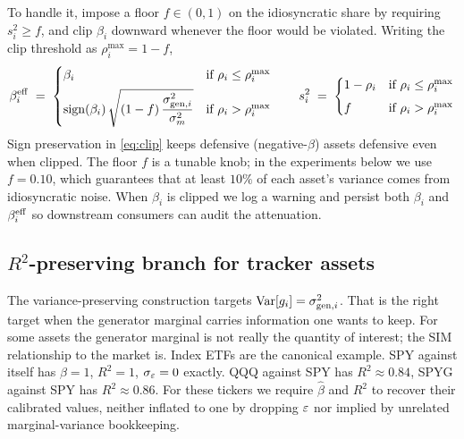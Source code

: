 To handle it, impose a floor $f \in (0, 1)$ on the idiosyncratic share by
requiring $s_i^2 \ge f$, and clip $\beta_i$ downward whenever the floor
would be violated. Writing the clip threshold as $\rho_i^{\max} = 1 - f$,
\begin{equation}
  \beta_i^{\mathrm{eff}} \;=\;
  \begin{cases}
    \beta_i & \text{if } \rho_i \le \rho_i^{\max} \\[4pt]
    \operatorname{sign}(\beta_i)\,\sqrt{(1 - f)\,\dfrac{\sigma_{\mathrm{gen},i}^2}{\sigma_m^2}} & \text{if } \rho_i > \rho_i^{\max}
  \end{cases}
  \qquad
  s_i^2 \;=\;
  \begin{cases}
    1 - \rho_i & \text{if } \rho_i \le \rho_i^{\max} \\[4pt]
    f          & \text{if } \rho_i > \rho_i^{\max}
  \end{cases}
  \label{eq:clip}
\end{equation}
Sign preservation in \eqref{eq:clip} keeps defensive (negative-$\beta$)
assets defensive even when clipped. The floor $f$ is a tunable knob; in the
experiments below we use $f = 0.10$, which guarantees that at least
$10\%$ of each asset's variance comes from idiosyncratic noise. When
$\beta_i$ is clipped we log a warning and persist both $\beta_i$ and
$\beta_i^{\mathrm{eff}}$ so downstream consumers can audit the attenuation.

\subsection{$R^2$-preserving branch for tracker assets}
\label{sec:method-r2}

The variance-preserving construction targets $\operatorname{Var}[g_i] = \sigma_{\mathrm{gen},i}^2$.
That is the right target when the generator marginal carries information one
wants to keep. For some assets the generator marginal is not really the
quantity of interest; the SIM relationship to the market is. Index ETFs are
the canonical example. SPY against itself has $\beta = 1$, $R^2 = 1$,
$\sigma_\varepsilon = 0$ exactly. QQQ against SPY has $R^2 \approx 0.84$, SPYG
against SPY has $R^2 \approx 0.86$. For these tickers we require $\hat\beta$ and $R^2$ to recover their
calibrated values, neither inflated to one by dropping $\varepsilon$ nor
implied by unrelated marginal-variance bookkeeping.

